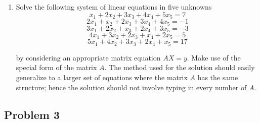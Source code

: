 \documentclass[11pt,a4paper]{article}
\begin{document}
\begin{enumerate}
	\item Solve the following system of linear equations in five unknowns
	$$x_{1} + 2x_{2} + 3x_{3} + 4x_{4} + 5x_{5} = 7$$
	$$2x_{1} + x_{2} + 2x_{3} + 3x_{4} + 4x_{5} = -1$$
	$$3x_{1} + 2x_{2} + x_{3} + 2x_{4} + 3x_{5} = -3$$
	$$4x_{1} + 3x_{2} + 2x_{3} + x_{4} + 2x_{5} = 5$$
	$$5x_{1} + 4x_{2} + 3x_{3} + 2x_{4} + x_{5} = 17$$
	
	by considering an appropriate matrix equation $AX = y$.
	Make use of the special form of the matrix $A$. The method used for the solution should easily generalize to a larger set of equations where the matrix $A$ has the same structure; hence the solution should not involve typing in every number of $A$.
	\end{enumerate}	

\subsection*{Problem 3}
\end{document}
